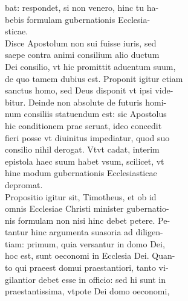 \documentclass{article}
\begin{document}
\begin{pages}
                bat: respondet, si non venero, hinc tu ha- \\
                bebis formulam gubernationis Ecclesia- \\
                sticae. \\
                Disce Apostolum non sui fuisse iuris, sed \\
                saepe contra animi consilium alio ductum \\
                Dei consilio, vt hic promittit aduentum suum, \\
                de quo tamem dubius est. Proponit igitur etiam \\
                sanctus homo, sed Deus disponit vt ipsi vide- \\
                bitur. Deinde non absolute de futuris homi- \\
                num consiliis statuendum est: sic Apostolus \\
                hic conditionem prae seruat, ideo concedit \\
                fieri posse vt diuinitus impediatur, quod suo \\
                consilio nihil derogat. Vtvt cadat, interim \\
                epistola haec suum habet vsum, scilicet, vt \\
                hine modum gubernationis Ecclesiasticae \\
                depromat. \\
                Propositio igitur sit, Timotheus, et ob id \\
                omnis Ecclesiae Christi minister gubernatio- \\
                nis formulam non nisi hinc debet petere. Pe- \\
                tantur hinc argumenta suasoria ad diligen- \\
                tiam: primum, quia versantur in domo Dei, \\
                hoc est, sunt oeconomi in Ecclesia Dei. Quan- \\
                to qui praeest domui praestantiori, tanto vi- \\
                gilantior debet esse in officio: sed hi sunt in \\
                praestantissima, vtpote Dei domo oeconomi, \\

\end{pages}
\end{document}
